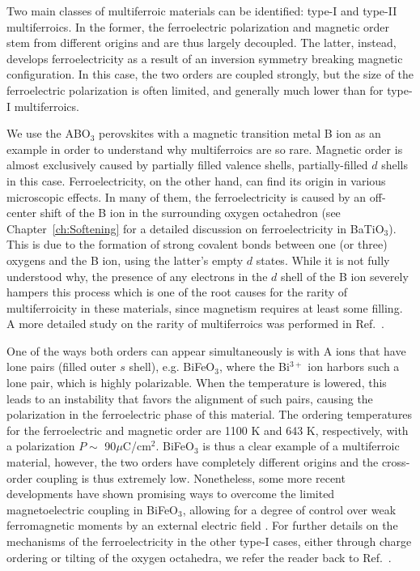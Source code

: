 Two main classes of multiferroic materials can be identified: type-I and type-II multiferroics.
In the former, the ferroelectric polarization and magnetic order stem from different origins and are thus largely decoupled.
The latter, instead, develops ferroelectricity as a result of an inversion symmetry breaking magnetic configuration.
In this case, the two orders are coupled strongly, but the size of the ferroelectric polarization is often limited, and generally much lower than for type-I multiferroics.

We use the ABO$_3$ perovskites with a magnetic transition metal B ion as an example in order to understand why multiferroics are so rare.
Magnetic order is almost exclusively caused by partially filled valence shells, partially-filled $d$ shells in this case.
Ferroelectricity, on the other hand, can find its origin in various microscopic effects.
In many of them, the ferroelectricity is caused by an off-center shift of the B ion in the surrounding oxygen octahedron (see Chapter~\ref{ch:Softening} for a detailed discussion on ferroelectricity in BaTiO$_3$).
This is due to the formation of strong covalent bonds between one (or three) oxygens and the B ion, using the latter's empty $d$ states. 
While it is not fully understood why, the presence of any electrons in the $d$ shell of the B ion severely hampers this process which is one of the root causes for the rarity of multiferroicity in these materials, since magnetism requires at least some filling.
A more detailed study on the rarity of multiferroics was performed in Ref.~\cite{Hill2000}.

One of the ways both orders can appear simultaneously is with A ions that have lone pairs (filled outer $s$ shell), e.g. BiFeO$_3$, where the Bi$^{3+}$ ion harbors such a lone pair, which is highly polarizable.
When the temperature is lowered, this leads to an instability that favors the alignment of such pairs, causing the polarization in the ferroelectric phase of this material.
The ordering temperatures for the ferroelectric and magnetic order are 1100 K and 643 K, respectively, with a polarization $P \sim$ 90$\mu$C/cm$^2$.
BiFeO$_3$ is thus a clear example of a multiferroic material, however, the two orders have completely different origins and the cross-order coupling is thus extremely low.
Nonetheless, some more recent developments have shown promising ways to overcome the limited magnetoelectric coupling in BiFeO$_3$, allowing for a degree of control over weak ferromagnetic moments by an external electric field \cite{Heron14}. 
For further details on the mechanisms of the ferroelectricity in the other type-I cases, either through charge ordering or tilting of the oxygen octahedra, we refer the reader back to Ref.~\cite{Khomskii2009}.

